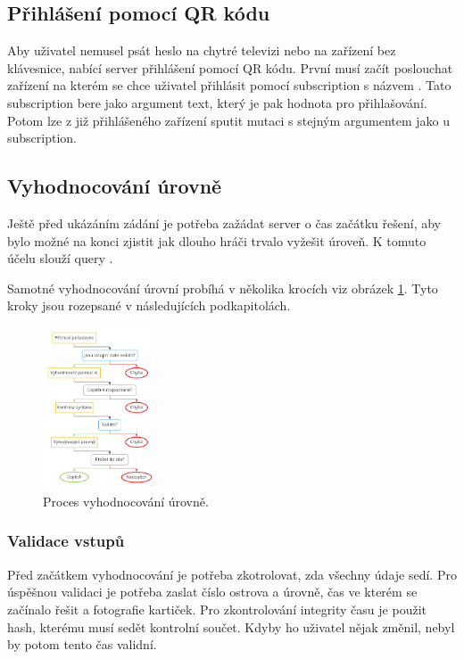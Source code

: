 \subsection{Přihlášení pomocí QR kódu}
Aby uživatel nemusel psát heslo na chytré televizi nebo na zařízení bez klávesnice, nabící server přihlášení pomocí QR kódu. První musí začít poslouchat zařízení na kterém se chce uživatel přihlásit pomocí subscription s názvem . Tato subscription bere jako argument text, který je pak hodnota pro přihlašování. Potom lze z již přihlášeného zařízení sputit mutaci  s stejným argumentem jako u subscription.

\subsection{Vyhodnocování úrovně}
Ještě před ukázáním zádání je potřeba zažádat server o čas začátku řešení, aby bylo možné na konci zjistit jak dlouho hráči trvalo vyžešit úroveň. K tomuto účelu slouží query .\par
Samotné vyhodnocování úrovní probíhá v několika krocích viz obrázek \ref{fig:proces-vyhodnocovani}. Tyto kroky jsou rozepsané v následujících podkapitolách.

\begin{figure}[h]
    \centering
    \includegraphics[width=0.3\textwidth]{img/proces.jpg}
    \caption{Proces vyhodnocování úrovně.}
    \label{fig:proces-vyhodnocovani}
\end{figure}

\subsubsection{Validace vstupů}
Před začátkem vyhodnocování je potřeba zkotrolovat, zda všechny údaje sedí. Pro úspěšnou validaci je potřeba zaslat číslo ostrova a úrovně, čas ve kterém se začínalo řešit a fotografie kartiček. Pro zkontrolování integrity času je použit hash, kterému musí sedět kontrolní součet. Kdyby ho uživatel nějak změnil, nebyl by potom tento čas validní.

